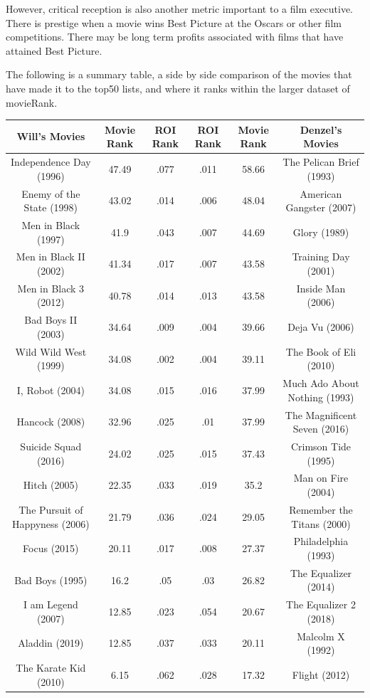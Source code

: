 \documentclass[]{article}
\begin{document}
However, critical reception is also another metric important to a film
executive. There is prestige when a movie wins Best Picture at the
Oscars or other film competitions. There may be long term profits
associated with films that have attained Best Picture.

The following is a summary table, a side by side comparison of the
movies that have made it to the top50 lists, and where it ranks within
the larger dataset of movieRank.

\vspace{5mm}

\hspace*{-2cm}\begin{tabular}{|c c c |c c c| }
\hline
Will's Movies & Movie Rank & ROI Rank & ROI Rank & Movie Rank & Denzel's Movies \\
\hline
  
Independence Day (1996) & 47.49 & .077 & .011 & 58.66 & The Pelican Brief (1993) \\
Enemy of the State (1998) & 43.02 & .014 & .006 & 48.04 & American Gangster (2007) \\
Men in Black (1997) & 41.9 & .043 & .007 &  44.69 & Glory (1989) \\
Men in Black II (2002) & 41.34 & .017 & .007 & 43.58 & Training Day (2001) \\
Men in Black 3 (2012) & 40.78 & .014 & .013 & 43.58 & Inside Man (2006) \\
Bad Boys II (2003) & 34.64 & .009 & .004 & 39.66 & Deja Vu (2006) \\
Wild Wild West (1999) & 34.08 & .002 & .004 & 39.11 & The Book of Eli (2010) \\
I, Robot (2004) & 34.08 & .015 & .016 & 37.99 & Much Ado About Nothing (1993) \\
Hancock (2008) & 32.96 & .025 & .01 & 37.99 & The Magnificent Seven (2016) \\
Suicide Squad (2016) & 24.02 & .025 & .015 & 37.43 & Crimson Tide (1995) \\
Hitch (2005) & 22.35 & .033 & .019 & 35.2 & Man on Fire (2004) \\
The Pursuit of Happyness (2006) & 21.79 & .036 & .024 & 29.05 & Remember the Titans (2000) \\
Focus (2015) & 20.11 & .017 & .008 & 27.37 & Philadelphia (1993) \\
Bad Boys (1995) & 16.2 & .05 & .03 & 26.82 & The Equalizer (2014) \\
I am Legend (2007) & 12.85 & .023 & .054 & 20.67 & The Equalizer 2 (2018) \\
Aladdin (2019) & 12.85 & .037 & .033 & 20.11 & Malcolm X (1992) \\
The Karate Kid (2010) & 6.15 & .062 & .028 & 17.32 & Flight (2012) \\
\hline
\end{tabular}
\vspace{5mm}
\end{document}
